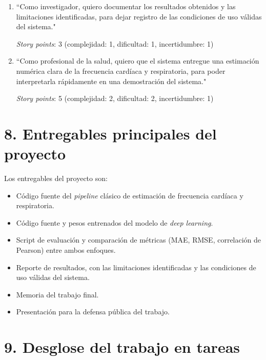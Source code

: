 \documentclass[
11pt, %
]{charter}
\begin{document}
\begin{enumerate}
		\textit{Story points}: 5 (complejidad: 2, dificultad: 2, incertidumbre: 1)
		
		\item ``Como investigador, quiero documentar los resultados obtenidos y las limitaciones identificadas, para dejar registro de las condiciones de uso válidas del sistema."
		
		\textit{Story points}: 3 (complejidad: 1, dificultad: 1, incertidumbre: 1)
		
		\item ``Como profesional de la salud, quiero que el sistema entregue una estimación numérica clara de la frecuencia cardíaca y respiratoria, para poder interpretarla rápidamente en una demostración del sistema."
		
		\textit{Story points}: 5 (complejidad: 2, dificultad: 2, incertidumbre: 1)
	\end{enumerate}
	
	\section{8. Entregables principales del proyecto}
	\label{sec:entregables}
	
	Los entregables del proyecto son:
	
	\begin{itemize}
		\item Código fuente del \textit{pipeline} clásico de estimación de frecuencia cardíaca y respiratoria.
		\item Código fuente y pesos entrenados del modelo de \textit{deep learning}.
		\item Script de evaluación y comparación de métricas (MAE, RMSE, correlación de Pearson) entre ambos enfoques.
		\item Reporte de resultados, con las limitaciones identificadas y las condiciones de uso válidas del sistema.
		\item Memoria del trabajo final.
		\item Presentación para la defensa pública del trabajo.
	\end{itemize}
	
	\section{9. Desglose del trabajo en tareas}
	\label{sec:wbs}
	
\end{document}
